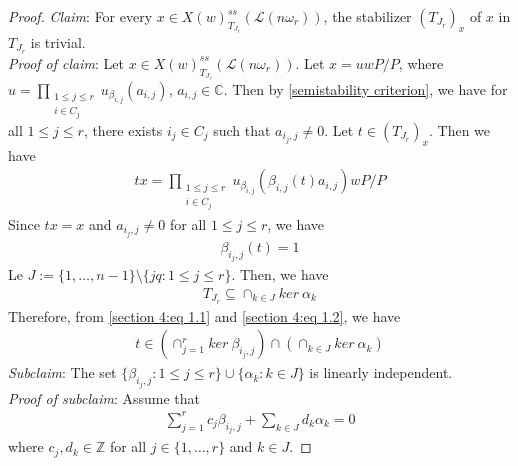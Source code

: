 \documentclass[12pt,reqno]{amsart}
\numberwithin{equation}{section}
\theoremstyle{definition}
\begin{document}
\begin{proof}
	{\it Claim}: For every $x\in X(w)^{ss}_{T_{J_{r}}}(\mathcal{L}(n\omega_{r}))$, the stabilizer $(T_{J_{r}})_{x}$ of $x$ in $T_{J_{r}}$ is trivial.\\
	{\it Proof of claim}: Let $x\in X(w)^{ss}_{T_{J_{r}}}(\mathcal{L}(n\omega_{r}))$. Let $x=uwP/P$, where $u=\prod_{\substack{1\leq j\leq r\\i\in C_{j}}}u_{\beta_{i,j}}(a_{i,j})$, $a_{i,j}\in\mathbb{C}$. Then by \cref{semistability criterion}, we have for all $1\leq j\leq r$, there exists $i_{j}\in C_{j}$ such that $a_{i_{j},j}\neq 0$. Let $t\in (T_{J_{r}})_{x}$. Then we have 
	\begin{align*}
		tx=\prod_{\substack{1\leq j\leq r\\i\in C_{j}}}u_{\beta_{i,j}}(\beta_{i,j}(t)a_{i,j})wP/P
	\end{align*} 
	Since $tx=x$ and $a_{i_{j},j}\neq 0$ for all $1\leq j\leq r$, we have  \begin{align}\label{section 4:eq 1.1}
		\beta_{i_{j},j}(t)=1
	\end{align}
Le $J:=\{1,\ldots,n-1\}\setminus\{jq:1\leq j\leq r\}$. Then, we have \begin{align}\label{section 4:eq 1.2}
		T_{J_{r}}\subseteq\cap_{k\in J}ker\ \alpha_{k}
	\end{align}
	Therefore, from \cref{section 4:eq 1.1} and \cref{section 4:eq 1.2}, we have 
	\begin{align}\label{section 4:eq 1.3}
		t\in (\cap_{j=1}^{r}ker\ \beta_{i_{j},j})\cap(\cap_{k\in J}ker\ \alpha_{k})
	\end{align}
{\it Subclaim}: The set $\{\beta_{i_{j},j}:1\leq j\leq r\}\cup\{\alpha_{k}:k\in J\}$ is linearly independent.\\
{\it Proof of subclaim}: Assume that \begin{align}\label{section 4:eq 1.4}
	 \sum_{j=1}^{r}c_{j}\beta_{i_{j},j}+\sum_{k\in J}d_{k}\alpha_{k}=0
\end{align}where $c_{j},d_{k}\in\mathbb{Z}$ for all $j\in\{1,\ldots,r\}$ and $k\in J$.


\end{proof}
\end{document}
